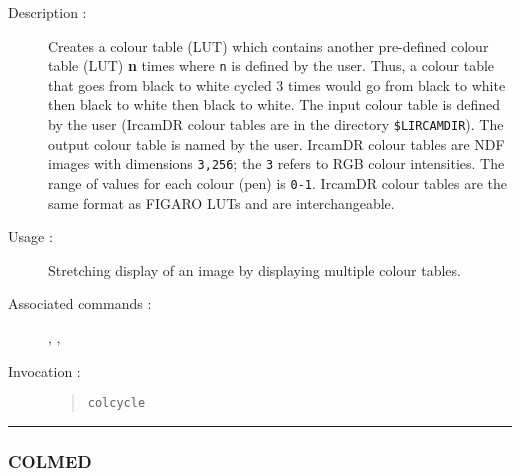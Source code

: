 \begin{description}

\item[Description :] Creates a colour table (LUT) which contains
another pre-defined colour table (LUT) {\bf n} times where {\tt n} is
defined by the user.  Thus, a colour table that goes from black to
white cycled 3 times would go from black to white then black to white
then black to white.  The input colour table is defined by the user
({\sc IrcamDR} colour tables are in the directory {\tt \$LIRCAMDIR}).
The output colour table is named by the user. {\sc IrcamDR} colour
tables are NDF images with dimensions {\tt 3,256}; the {\tt 3} refers
to RGB colour intensities.  The range of values for each colour (pen)
is {\tt 0-1}.  {\sc IrcamDR} colour tables are the same format as
FIGARO LUTs and are interchangeable.

\item[Usage :] Stretching display of an image by displaying multiple colour
tables.

\item[Associated commands :] {\tt {}},
{\tt {}}, {\tt {}}

\item[Invocation :]

\begin{quote}{\tt  colcycle }\end{quote}

\end{description}

\hrule
\subsubsection*{\label{COLMED}COLMED}

